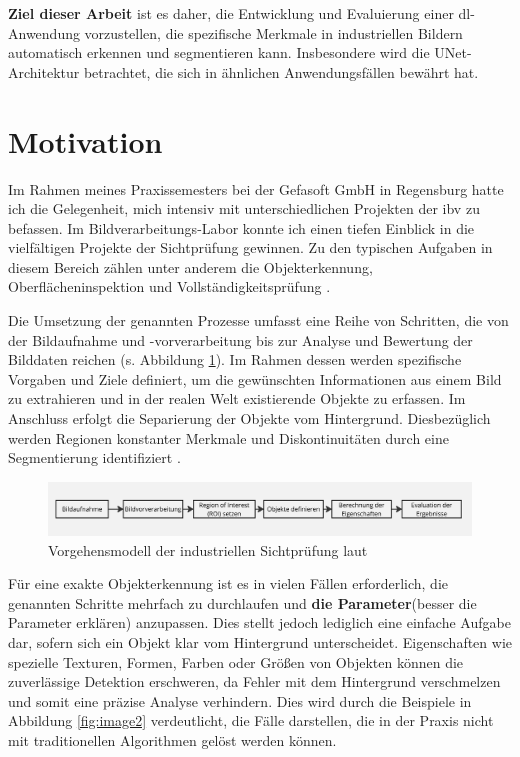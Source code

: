 \textbf{Ziel dieser Arbeit} ist es daher, die Entwicklung und Evaluierung einer \gls{dl}-Anwendung vorzustellen, die spezifische Merkmale in industriellen Bildern automatisch erkennen und segmentieren kann. Insbesondere wird die UNet-Architektur betrachtet, die sich in ähnlichen Anwendungsfällen bewährt hat.

\section{Motivation}\label{expose_motivation}

Im Rahmen meines Praxissemesters bei der Gefasoft GmbH in Regensburg hatte ich die Gelegenheit, mich intensiv mit unterschiedlichen Projekten der \gls{ibv} zu befassen. Im Bildverarbeitungs-Labor konnte ich einen tiefen Einblick in die vielfältigen Projekte der Sichtprüfung gewinnen. Zu den typischen Aufgaben in diesem Bereich zählen unter anderem die Objekterkennung, Oberflächeninspektion und Vollständigkeitsprüfung \cite[S. 5]{demant_industrielle_2011}.

Die Umsetzung der genannten Prozesse umfasst eine Reihe von Schritten, die von der Bildaufnahme und -vorverarbeitung bis zur Analyse und Bewertung der Bilddaten reichen (s. Abbildung \ref{fig:vorgehensmodell}). Im Rahmen dessen werden spezifische Vorgaben und Ziele definiert, um die gewünschten Informationen aus einem Bild zu extrahieren und in der realen Welt existierende Objekte zu erfassen. Im Anschluss erfolgt die Separierung der Objekte vom Hintergrund. Diesbezüglich werden Regionen konstanter Merkmale und Diskontinuitäten durch eine Segmentierung identifiziert \cite[S.13]{jahne_digitale_2024}.

\begin{figure}[h]
    \centering
    \includegraphics[width=1\linewidth]{expose/Vorgehensmodell_IBV.jpg}
    \caption{Vorgehensmodell der industriellen Sichtprüfung laut \cite[S.15]{demant_industrielle_2011}}
    \label{fig:vorgehensmodell}
\end{figure}

Für eine exakte Objekterkennung ist es in vielen Fällen erforderlich, die genannten Schritte mehrfach zu durchlaufen und \textbf{die Parameter}(besser die Parameter erklären) anzupassen. Dies stellt jedoch lediglich eine einfache Aufgabe dar, sofern sich ein Objekt klar vom Hintergrund unterscheidet. Eigenschaften wie spezielle Texturen, Formen, Farben oder Größen von Objekten können die zuverlässige Detektion erschweren, da Fehler mit dem Hintergrund verschmelzen und somit eine präzise Analyse verhindern. Dies wird durch die Beispiele in Abbildung \ref{fig:image2} verdeutlicht, die Fälle darstellen, die in der Praxis nicht mit traditionellen Algorithmen gelöst werden können.

